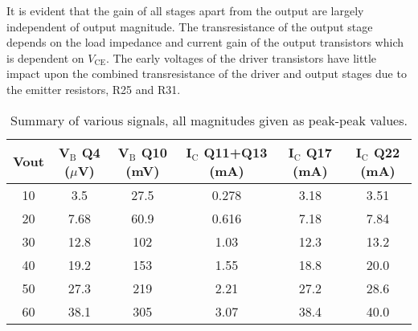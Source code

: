 \documentclass[a4paper,10pt, oneside]{article}
\begin{document}
It is evident that the gain of all stages apart from the output are largely independent of output magnitude. The transresistance of the output stage depends on the load impedance and current gain of the output transistors which is dependent on $V_{\textrm{CE}}$. The early voltages of the driver transistors have little impact upon the combined transresistance of the driver and output stages due to the emitter resistors, R25 and R31.


\vspace{5mm}
\begin{table}
\begin{centering}
\begin{tabular}{|c|c|c|c|c|c|}
	\hline
	Vout & V$_{\textrm{B}}$ Q4 ($\mu$V) & V$_{\textrm{B}}$ Q10 (mV) & I$_{\textrm{C}}$ Q11+Q13 (mA) & I$_{\textrm{C}}$ Q17 (mA) & I$_{\textrm{C}}$ Q22 (mA) \\ [0.5ex] 
	\hline\hline 10 & 3.5  & 27.5 & 0.278 & 3.18 & 3.51 \\ 
	\hline 20 & 7.68 & 60.9 & 0.616 & 7.18 & 7.84 \\ 
	\hline 30 & 12.8 & 102  & 1.03 & 12.3 & 13.2 \\ 
	\hline 40 & 19.2 & 153  & 1.55 & 18.8 & 20.0 \\ 
	\hline 50 & 27.3 & 219  & 2.21  & 27.2 & 28.6 \\ 
	\hline 60 & 38.1 & 305  & 3.07  & 38.4 & 40.0 \\ 
	\hline 
\end{tabular}
\caption{Summary of various signals, all magnitudes given as peak-peak values.}
\label{table:1}	
\end{centering}
\end{table}
\vspace{5mm}
\end{document}
